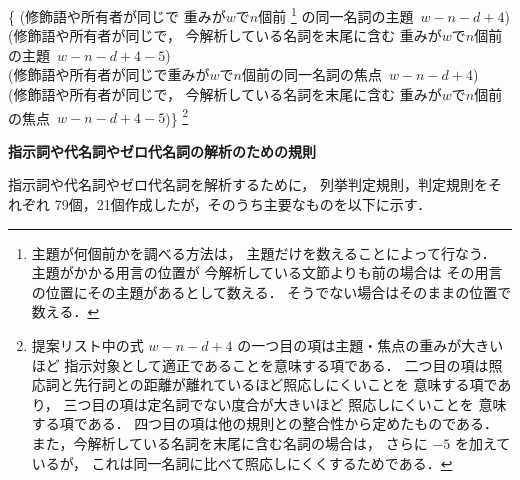 {\begin{enumerate}
  \{
  (修飾語や所有者が同じで
  重みが$w$で$n$個前
  \footnote{
    主題が何個前かを調べる方法は，
    主題だけを数えることによって行なう．
    主題がかかる用言の位置が
    今解析している文節よりも前の場合は
    その用言の位置にその主題があるとして数える．
    そうでない場合はそのままの位置で数える．} 
  の同一名詞の主題 \,$w-n-d+4$)\\ 
  (修飾語や所有者が同じで，
  今解析している名詞を末尾に含む
  重みが$w$で$n$個前の主題 \,$w-n-d+4-5$)\\ 
  (修飾語や所有者が同じで重みが$w$で$n$個前の同一名詞の焦点 \,$w-n-d+4$)\\ 
  (修飾語や所有者が同じで，
  今解析している名詞を末尾に含む
  重みが$w$で$n$個前の焦点 \,$w-n-d+4-5$)\}
  \footnote{\label{foot:meishi_shouou}
  提案リスト中の式 $w-n-d+4$ の一つ目の項は主題・焦点の重みが大きいほど
  指示対象として適正であることを意味する項である．
  二つ目の項は照応詞と先行詞との距離が離れているほど照応しにくいことを
  意味する項であり，
  三つ目の項は定名詞でない度合が大きいほど
  照応しにくいことを
  意味する項である．
  四つ目の項は他の規則との整合性から定めたものである．
  また，今解析している名詞を末尾に含む名詞の場合は，
  さらに $-5$ を加えているが，
  これは同一名詞に比べて照応しにくくするためである．
  }

\end{enumerate}
}

{\bf 指示詞や代名詞やゼロ代名詞の解析のための規則}

指示詞や代名詞やゼロ代名詞を解析するために，
列挙判定規則，判定規則をそれぞれ
79個，21個作成したが，そのうち主要なものを以下に示す．

